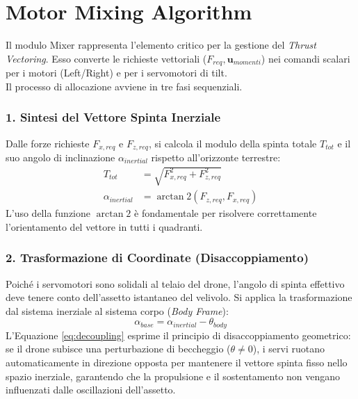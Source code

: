 \section{Motor Mixing Algorithm}
Il modulo Mixer rappresenta l'elemento critico per la gestione del \textit{Thrust Vectoring}. Esso converte le richieste vettoriali ($F_{req}, \mathbf{u}_{momenti}$) nei comandi scalari per i motori (Left/Right) e per i servomotori di tilt.
\\Il processo di allocazione avviene in tre fasi sequenziali.

\subsubsection{1. Sintesi del Vettore Spinta Inerziale}
Dalle forze richieste $F_{x,req}$ e $F_{z,req}$, si calcola il modulo della spinta totale $T_{tot}$ e il suo angolo di inclinazione $\alpha_{inertial}$ rispetto all'orizzonte terrestre:
\begin{align}
    T_{tot} &= \sqrt{F_{x,req}^2 + F_{z,req}^2} \\
    \alpha_{inertial} &= \arctan2\left( F_{z,req}, F_{x,req} \right)
\end{align}
L'uso della funzione $\arctan2$ è fondamentale per risolvere correttamente l'orientamento del vettore in tutti i quadranti.

\subsubsection{2. Trasformazione di Coordinate (Disaccoppiamento)}
Poiché i servomotori sono solidali al telaio del drone, l'angolo di spinta effettivo deve tenere conto dell'assetto istantaneo del velivolo. Si applica la trasformazione dal sistema inerziale al sistema corpo (\textit{Body Frame}):
\begin{equation}
    \alpha_{base} = \alpha_{inertial} - \theta_{body}
    \label{eq:decoupling}
\end{equation}
L'Equazione \ref{eq:decoupling} esprime il principio di disaccoppiamento geometrico: se il drone subisce una perturbazione di beccheggio ($\theta \neq 0$), i servi ruotano automaticamente in direzione opposta per mantenere il vettore spinta fisso nello spazio inerziale, garantendo che la propulsione e il sostentamento non vengano influenzati dalle oscillazioni dell'assetto.

